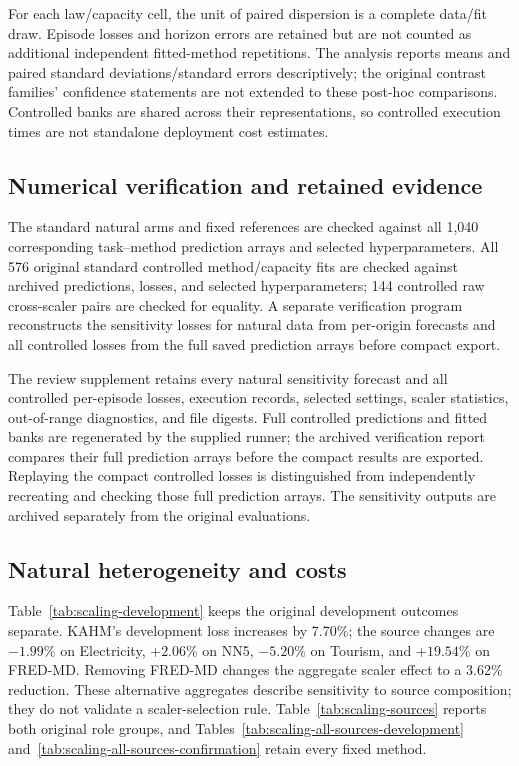 For each law/capacity cell, the unit of paired dispersion is a complete
data/fit draw. Episode losses and horizon errors are retained but are not
counted as additional independent fitted-method repetitions. The analysis
reports means and paired standard deviations/standard errors descriptively;
the original contrast families' confidence statements are not extended to
these post-hoc comparisons. Controlled banks are shared across their
representations, so controlled execution times are not standalone deployment
cost estimates.

\subsection{Numerical verification and retained evidence}
The standard natural arms and fixed references are checked against all 1,040
corresponding task--method prediction arrays and selected hyperparameters.
All 576 original
standard controlled method/capacity fits are checked against archived
predictions, losses, and selected hyperparameters; 144 controlled raw
cross-scaler pairs are checked for equality. A separate verification program reconstructs
the sensitivity losses for natural data from per-origin forecasts and all controlled losses
from the full saved prediction arrays before compact export.

The review supplement retains every natural sensitivity forecast and all
controlled per-episode losses, execution records, selected settings, scaler
statistics, out-of-range diagnostics, and file digests. Full controlled
predictions and fitted banks are regenerated by the supplied runner; the archived verification report compares their full prediction arrays
before the compact results are exported.
Replaying the compact controlled losses is distinguished from independently
recreating and checking those full prediction arrays. The sensitivity outputs are archived separately from the original
evaluations.

\subsection{Natural heterogeneity and costs}
Table~\ref{tab:scaling-development} keeps the original development outcomes
separate. KAHM's development loss increases by 7.70\%; the source changes
are $-1.99$\% on Electricity, $+2.06$\% on NN5, $-5.20$\% on Tourism,
and $+19.54$\% on FRED-MD. Removing FRED-MD changes the aggregate scaler
effect to a 3.62\% reduction. These alternative aggregates describe sensitivity to source composition;
they do not validate a scaler-selection rule.
Table~\ref{tab:scaling-sources} reports both original role groups, and
Tables~\ref{tab:scaling-all-sources-development}
and~\ref{tab:scaling-all-sources-confirmation} retain every fixed method.

